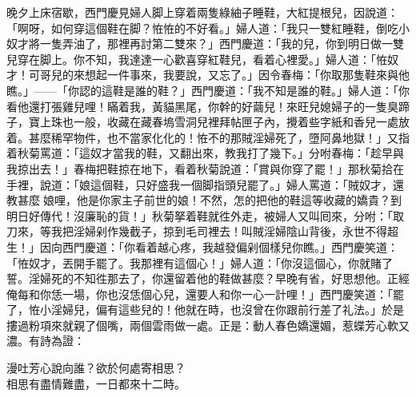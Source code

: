 晚夕上床宿歇，西門慶見婦人脚上穿着兩隻綠紬子睡鞋，大紅提根兒，因說道：「啊呀，如何穿這個鞋在脚？恠恠的不好看。」婦人道：「我只一雙紅睡鞋，倒吃小奴才將一隻弄油了，那裡再討第二雙來？」西門慶道：「我的兒，你到明日做一雙兒穿在脚上。你不知，我達達一心歡喜穿紅鞋兒，看着心裡愛。」婦人道：「恠奴才！可哥兒的來想起一件事來，我要說，又忘了。」因令春梅：「你取那隻鞋來與他瞧。」——「你認的這鞋是誰的鞋？」西門慶道：「我不知是誰的鞋。」婦人道：「你看他還打張雞兒哩！瞞着我，黃貓黑尾，你幹的好繭兒！來旺兒媳婦子的一隻臭蹄子，寶上珠也一般，收藏在藏春塢雪洞兒裡拜帖匣子內，攪着些字紙和香兒一處放着。甚麼稀罕物件，也不當家化化的！恠不的那賊淫婦死了，墮阿鼻地獄！」{}又指着秋菊罵道：「這奴才當我的鞋，又翻出來，教我打了幾下。」分咐春梅：「趁早與我掠出去！」春梅把鞋掠在地下，看着秋菊說道：「賞與你穿了罷！」那秋菊拾在手裡，說道：「娘這個鞋，只好盛我一個脚指頭兒罷了。」婦人罵道：「賊奴才，還教甚麼𣭈娘哩，他是你家主子前世的娘！不然，怎的把他的鞋這等收藏的嬌貴？到明日好傳代！沒廉恥的貨！」秋菊拏着鞋就徃外走，被婦人又叫囘來，分咐：「取刀來，等我把淫婦剁作幾截子，掠到毛司裡去！叫賊淫婦陰山背後，永世不得超生！」{}因向西門慶道：「你看着越心疼，我越發偏剁個樣兒你瞧。」西門慶笑道：「恠奴才，丟開手罷了。我那裡有這個心！」婦人道：「你沒這個心，你就賭了誓。淫婦死的不知徃那去了，你還留着他的鞋做甚麼？早晚有省，好思想他。正經俺每和你恁一場，你也沒恁個心兒，還要人和你一心一計哩！」{}西門慶笑道：「罷了，恠小淫婦兒，偏有這些兒的！他就在時，也沒曾在你跟前行差了礼法。」於是摟過粉項來就親了個嘴，兩個雲雨做一處。正是：動人春色嬌還媚，惹蝶芳心軟又濃。有詩為證：

\begin{myquote}
漫吐芳心說向誰？欲於何處寄相思？\\相思有盡情難盡，一日都來十二時。
\end{myquote}

